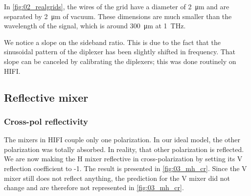 In \cref{fig:02_realgrids}, the wires of the grid have a diameter of \SI{2}{\micro\meter} and are separated by \SI{2}{\micro\meter} of vacuum.
These dimensions are much smaller than the wavelength of the signal, which is around \SI{300}{\micro\meter} at \SI{1}{\tera\hertz}.

We notice a slope on the sideband ratio.
This is due to the fact that the sinusoidal pattern of the diplexer has been slightly shifted in frequency.
That slope can be canceled by calibrating the diplexers; this was done routinely on HIFI.


\clearpage
\subsection{Reflective mixer}

\subsubsection{Cross-pol reflectivity}
The mixers in HIFI couple only one polarization.
In our ideal model, the other polarization was totally absorbed.
In reality, that other polarization is reflected.
We are now making the H mixer reflective in cross-polarization by setting its V reflection coefficient to -1.
The result is presented in \cref{fig:03_mh_cr}.
Since the V mixer still does not reflect anything, the prediction for the V mixer did not change and are therefore not represented in \cref{fig:03_mh_cr}.

